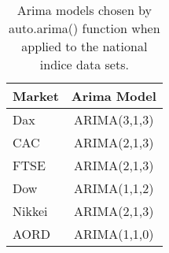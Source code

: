 \begin{table}[ht]
\centering
\caption[Arima models chosen by auto.arima() function]{Arima models chosen by auto.arima() function when applied to the national indice data sets.} 
\label{tab:chp_ts_arima_models_chp6}
\begin{tabular}{lc}
  \toprule Market & Arima Model \\ 
  \midrule Dax & ARIMA(3,1,3)                    \\ 
  CAC & ARIMA(2,1,3)                    \\ 
  FTSE & ARIMA(2,1,3)                    \\ 
  Dow & ARIMA(1,1,2)                    \\ 
  Nikkei & ARIMA(2,1,3)                    \\ 
  AORD & ARIMA(1,1,0)                    \\ 
   \bottomrule \end{tabular}
\end{table}
